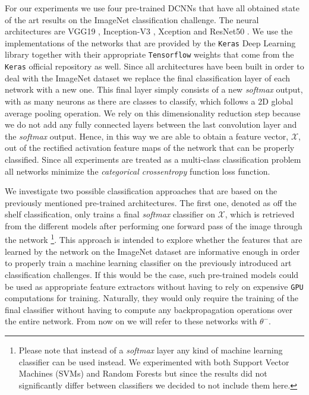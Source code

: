 For our experiments we use four pre-trained DCNNs that have all obtained state of the art results on the ImageNet classification challenge. The neural architectures are VGG19 \cite{simonyan2014very}, Inception-V3 \cite{szegedy2016rethinking}, Xception \cite{chollet2016xception} and ResNet50 \cite{xie2017aggregated}. We use the implementations of the networks that are provided by the \texttt{Keras} Deep Learning library \cite{chollet2015keras} together with their appropriate \texttt{Tensorflow} weights \cite{abadi2016tensorflow} that come from the \texttt{Keras} official repository as well. Since all architectures have been built in order to deal with the ImageNet dataset we replace the final classification layer of each network with a new one. This final layer simply consists of a new \textit{softmax} output, with as many neurons as there are classes to classify, which follows a 2D global average pooling operation. We rely on this dimensionality reduction step because we do not add any fully connected layers between the last convolution layer and the \textit{softmax} output. Hence, in this way we are able to obtain a feature vector, $\mathscr{X}$, out of the rectified activation feature maps of the network that can be properly classified. Since all experiments are treated as a multi-class classification problem all networks minimize the \textit{categorical crossentropy} function loss function.

We investigate two possible classification approaches that are based on the previously mentioned pre-trained architectures. The first one, denoted as off the shelf classification, only trains a final \textit{softmax} classifier on $\mathscr{X}$, which is retrieved from the different models after performing one forward pass of the image through the network \footnote{Please note that instead of a \textit{softmax} layer any kind of machine learning classifier can be used instead. We experimented with both Support Vector Machines (SVMs) and Random Forests but since the results did not significantly differ between classifiers we decided to not include them here.}. This approach is intended to explore whether the features that are learned by the network on the ImageNet dataset are informative enough in order to properly train a machine learning classifier on the previously introduced art classification challenges. If this would be the case, such pre-trained models could be used as appropriate feature extractors without having to rely on expensive \texttt{GPU} computations for training. Naturally, they would only require the training of the final classifier without having to compute any backpropagation operations over the entire network. From now on we will refer to these networks with $\theta^{-}$. 


